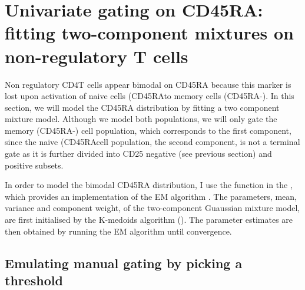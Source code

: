 \clearpage

\section{Univariate gating on CD45RA: fitting two-component mixtures on non-regulatory T cells}

Non regulatory CD4\positive T cells appear bimodal on CD45RA because this marker is lost upon activation of naive cells (CD45RA\positive to memory cells (CD45RA-).
In this section, we will model the CD45RA distribution by fitting a two component mixture model.
Although we model both populations, we will only gate the memory (CD45RA-) cell population, which corresponds to the first component,
since the naive (CD45RA\positive cell population, the second component, is not a terminal gate as
it is further divided into CD25 negative (see previous section) and positive subsets.


In order to model the bimodal CD45RA distribution, I use the  function in the ,
which provides an implementation of the \Gls{EM} algorithm \citep{Dempster:1977ul}.
The parameters, mean, variance and component weight, of the two-component Guaussian mixture model,
are first initialised by the K-medoids algorithm ().
The parameter estimates are then obtained  by running the EM algorithm until convergence.

\subsection{Emulating manual gating by picking a threshold}


